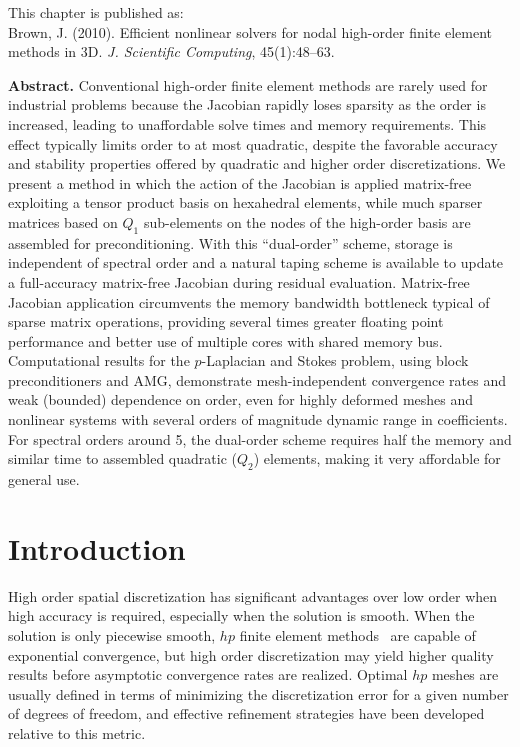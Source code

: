 \textsf{This chapter is published as:\\
  Brown, J. (2010). Efficient nonlinear solvers for nodal high-order finite element methods in 3D. \emph{J. Scientific Computing}, 45(1):48--63.}

\vspace{0.5cm}

\textbf{Abstract.}
  Conventional high-order finite element methods are rarely used for industrial problems because the Jacobian rapidly
  loses sparsity as the order is increased, leading to unaffordable solve times and memory requirements.  This effect
  typically limits order to at most quadratic, despite the favorable accuracy and stability properties offered by
  quadratic and higher order discretizations.  We present a method in which the action of the Jacobian is applied
  matrix-free exploiting a tensor product basis on hexahedral elements, while much sparser matrices based on $Q_1$
  sub-elements on the nodes of the high-order basis are assembled for preconditioning.  With this ``dual-order'' scheme,
  storage is independent of spectral order and a natural taping scheme is available to update a full-accuracy
  matrix-free Jacobian during residual evaluation.  Matrix-free Jacobian application circumvents the memory bandwidth
  bottleneck typical of sparse matrix operations, providing several times greater floating point performance and better
  use of multiple cores with shared memory bus.  Computational results for the $p$-Laplacian and Stokes problem, using
  block preconditioners and AMG, demonstrate mesh-independent convergence rates and weak (bounded) dependence on order,
  even for highly deformed meshes and nonlinear systems with several orders of magnitude dynamic range in coefficients.
  For spectral orders around 5, the dual-order scheme requires half the memory and similar time to assembled quadratic
  ($Q_2$) elements, making it very affordable for general use.

\section{Introduction}
High order spatial discretization has significant advantages over low order when high accuracy is required, especially
when the solution is smooth.  When the solution is only piecewise smooth, $hp$ finite element
methods~\citep{demkowicz1989tuh,oden1989tuh,rachowicz1989tuh,schwab1998pah} are capable of exponential
convergence, but high order discretization may yield higher quality results before asymptotic convergence rates are
realized.  Optimal $hp$ meshes are usually defined in terms of minimizing the discretization error for a given number of
degrees of freedom, and effective refinement strategies \citep[\eg][]{ainsworth1998ars,demkowicz2002fah} have been
developed relative to this metric.

